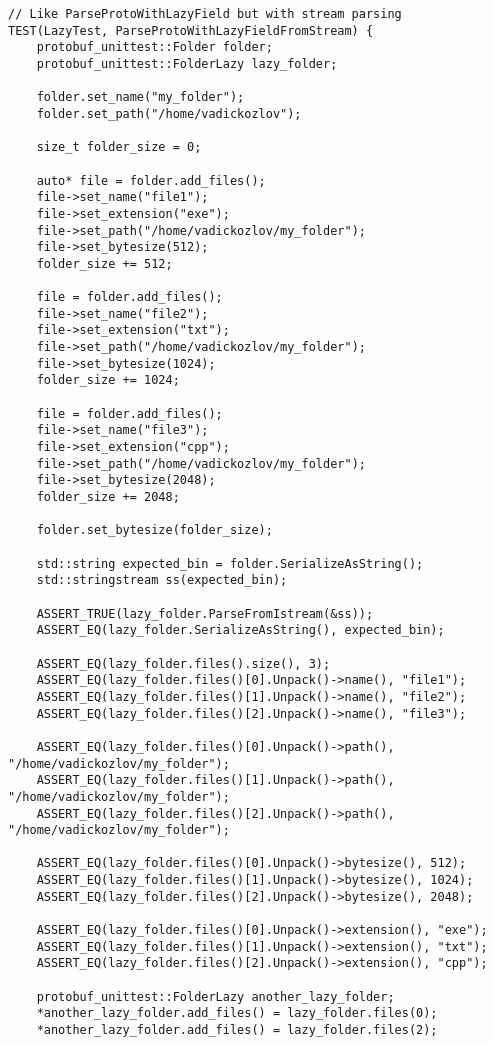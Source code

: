 \begin{lstlisting}[style=CodeListing, label=sec_testing:code:tests, caption={Реализация тестов с помощью фреймворка Google Test}]
// Like ParseProtoWithLazyField but with stream parsing
TEST(LazyTest, ParseProtoWithLazyFieldFromStream) {
    protobuf_unittest::Folder folder;
    protobuf_unittest::FolderLazy lazy_folder;

    folder.set_name("my_folder");
    folder.set_path("/home/vadickozlov");

    size_t folder_size = 0;

    auto* file = folder.add_files();
    file->set_name("file1");
    file->set_extension("exe");
    file->set_path("/home/vadickozlov/my_folder");
    file->set_bytesize(512);
    folder_size += 512;

    file = folder.add_files();
    file->set_name("file2");
    file->set_extension("txt");
    file->set_path("/home/vadickozlov/my_folder");
    file->set_bytesize(1024);
    folder_size += 1024;

    file = folder.add_files();
    file->set_name("file3");
    file->set_extension("cpp");
    file->set_path("/home/vadickozlov/my_folder");
    file->set_bytesize(2048);
    folder_size += 2048;

    folder.set_bytesize(folder_size);

    std::string expected_bin = folder.SerializeAsString();
    std::stringstream ss(expected_bin);

    ASSERT_TRUE(lazy_folder.ParseFromIstream(&ss));
    ASSERT_EQ(lazy_folder.SerializeAsString(), expected_bin);

    ASSERT_EQ(lazy_folder.files().size(), 3);
    ASSERT_EQ(lazy_folder.files()[0].Unpack()->name(), "file1");
    ASSERT_EQ(lazy_folder.files()[1].Unpack()->name(), "file2");
    ASSERT_EQ(lazy_folder.files()[2].Unpack()->name(), "file3");

    ASSERT_EQ(lazy_folder.files()[0].Unpack()->path(), "/home/vadickozlov/my_folder");
    ASSERT_EQ(lazy_folder.files()[1].Unpack()->path(), "/home/vadickozlov/my_folder");
    ASSERT_EQ(lazy_folder.files()[2].Unpack()->path(), "/home/vadickozlov/my_folder");

    ASSERT_EQ(lazy_folder.files()[0].Unpack()->bytesize(), 512);
    ASSERT_EQ(lazy_folder.files()[1].Unpack()->bytesize(), 1024);
    ASSERT_EQ(lazy_folder.files()[2].Unpack()->bytesize(), 2048);

    ASSERT_EQ(lazy_folder.files()[0].Unpack()->extension(), "exe");
    ASSERT_EQ(lazy_folder.files()[1].Unpack()->extension(), "txt");
    ASSERT_EQ(lazy_folder.files()[2].Unpack()->extension(), "cpp");

    protobuf_unittest::FolderLazy another_lazy_folder;
    *another_lazy_folder.add_files() = lazy_folder.files(0);
    *another_lazy_folder.add_files() = lazy_folder.files(2);


\end{lstlisting}
